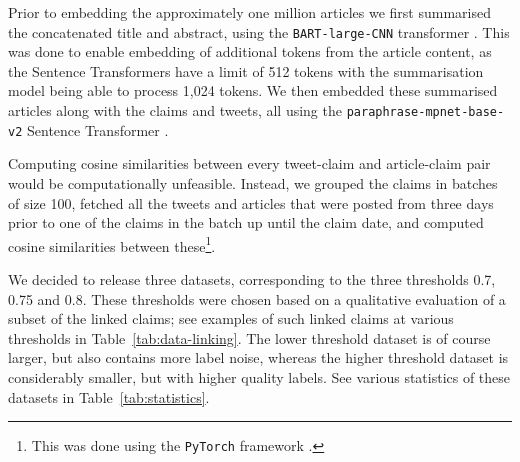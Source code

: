 \documentclass[sigconf,natbib=true,anonymous=false,nonacm]{acmart}
\newif\ifpreprint
\begin{document}
Prior to embedding the approximately one million articles we first summarised
the concatenated title and abstract, using the \texttt{BART-large-CNN}
transformer \citep{lewis2019bart}. This was done to enable embedding of
additional tokens from the article content, as the Sentence Transformers have a
limit of 512 tokens with the summarisation model being able to process 1,024
tokens. We then embedded these summarised articles along with the claims and
tweets, all using the \texttt{paraphrase-mpnet-base-v2} Sentence Transformer
\cite{reimers2019sentencebert}.

Computing cosine similarities between every tweet-claim and article-claim pair
would be computationally unfeasible. Instead, we grouped the claims in batches
of size 100, fetched all the tweets and articles that were posted from three
days prior to one of the claims in the batch up until the claim date, and
computed cosine similarities between these\footnote{This was done using the
\texttt{PyTorch} framework \citep{paszke2019pytorch}.}.

\ifpreprint The resulting cosine similarity distribution can be found in the
appendix.\fi We decided to release three datasets, corresponding to the three
thresholds 0.7, 0.75 and 0.8. These thresholds were chosen based on a
qualitative evaluation of a subset of the linked claims; see examples of such
linked claims at various thresholds in Table~\ref{tab:data-linking}. The lower
threshold dataset is of course larger, but also contains more label noise,
whereas the higher threshold dataset is considerably smaller, but with higher
quality labels. See various statistics of these datasets in
Table~\ref{tab:statistics}.
\end{document}
